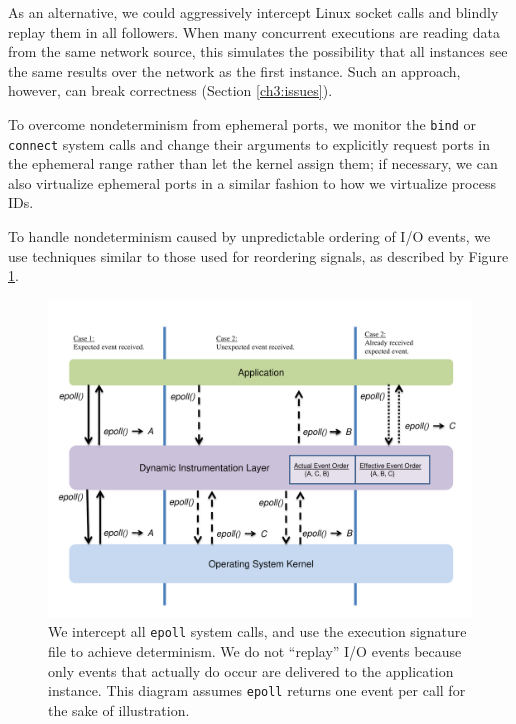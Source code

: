 As an alternative, we could
aggressively intercept Linux socket calls
and blindly replay them in all followers.
When many concurrent executions are reading data from the
same network source, this simulates the possibility
that all instances see the same results over the network
as the first instance. Such an approach, however,
can break correctness (Section \ref{ch3:issues}).
          
\newpage 
To overcome nondeterminism from ephemeral ports, 
we monitor the \texttt{bind} or \texttt{connect} 
system calls and change their arguments to explicitly request ports
in the ephemeral range rather than let the kernel 
assign them; if necessary,
we can also virtualize ephemeral ports
in a similar fashion to how we virtualize process IDs. \newline


 \newline
To handle nondeterminism caused by unpredictable
ordering of I/O events,
we use techniques similar to those used 
for reordering signals,
as described by Figure \ref{ch3:reorderfig}.

\begin{figure}[h]
  \center
  \includegraphics[trim=0cm 1.25cm 0cm 0.75cm, scale=0.60]{epoll.pdf}
  \caption[Reordering I/O events using Pin]%
    {We intercept all \texttt{epoll} system calls,
    and use the execution signature file to
    achieve determinism. We do not ``replay'' I/O
    events because only events that actually do occur
    are delivered to the application instance. This
    diagram assumes \texttt{epoll} returns one event
    per call for the sake of illustration. }       
  \label{ch3:reorderfig}
\end{figure} 
              
